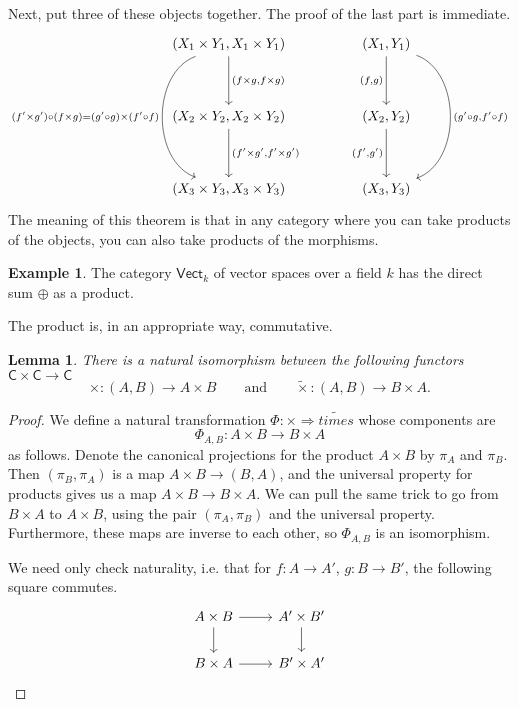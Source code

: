 \documentclass[a4paper,10pt]{scrreprt}
\theoremstyle{definition}
\newtheorem{example}{Example}[section]
\theoremstyle{plain}
\newtheorem{lemma}{Lemma}[section]
\theoremstyle{remark}
\begin{document}
Next, put three of these objects together. The proof of the last part is immediate.
\begin{equation*}
  \begin{tikzcd}[column sep=huge, row sep=huge]
    {(X_{1} \times Y_{1}, X_{1} \times Y_{1})}  \arrow[d, "{(f\times g, f\times g)}"] \arrow[dd, bend right=70, swap, "{(f'\times g') \circ (f\times g)} = (g' \circ g) \times (f' \circ f)"]  & (X_{1}, Y_{1}) \arrow[d, swap, "{(f,g)}"] \arrow[dd, bend left=70, "{(g'\circ g, f' \circ f)}"] \\
    {(X_{2} \times Y_{2}, X_{2} \times Y_{2})}\arrow[d, "{(f'\times g', f'\times g')}"]  & (X_{2}, Y_{2}) \arrow[d, swap, "{(f',g')}"] \\
    {(X_{3} \times Y_{3}, X_{3} \times Y_{3})}  & (X_{3}, Y_{3})
  \end{tikzcd}
\end{equation*}
The meaning of this theorem is that in any category where you can take products of the objects, you can also take products of the morphisms.

\begin{example}
  The category $\mathsf{Vect}_{k}$ of vector spaces over a field $k$ has the direct sum $\oplus$ as a product. 
\end{example}

The product is, in an appropriate way, commutative.
\begin{lemma}
  There is a natural isomorphism between the following functors $\mathsf{C} \times \mathsf{C} \to \mathsf{C}$
  \begin{equation*}
    \times\colon (A, B) \to A \times B\qquad\text{and}\qquad \tilde{\times}\colon (A, B) \to B \times A.
  \end{equation*}
\end{lemma}
\begin{proof}
  We define a natural transformation $\Phi\colon \times \Rightarrow \tilde{times}$ whose components are 
  \begin{equation*}
    \Phi_{A, B}\colon A \times B \to B \times A
  \end{equation*}
  as follows. Denote the canonical projections for the product $A \times B$ by $\pi_{A}$ and $\pi_{B}$. Then $(\pi_{B}, \pi_{A})$ is a map $A \times B \to (B, A)$, and the universal property for products gives us a map $A \times B \to B \times A$. We can pull the same trick to go from $B \times A$ to $A \times B$, using the pair $(\pi_{A}, \pi_{B})$ and the universal property. Furthermore, these maps are inverse to each other, so $\Phi_{A, B}$ is an isomorphism.

  We need only check naturality, i.e. that for $f\colon A \to A'$, $g\colon B \to B'$, the following square commutes.
  \begin{equation*}
    \begin{tikzcd}
      A \times B
      \arrow[r]
      \arrow[d, swap]
      & A' \times B'
      \arrow[d]
      \\
      B \times A
      \arrow[r]
      & B' \times A'
    \end{tikzcd}
  \end{equation*}
\end{proof}
\end{document}
